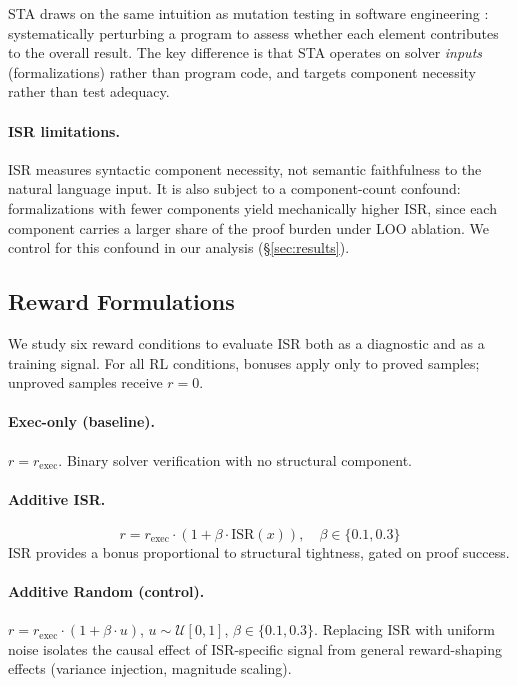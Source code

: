 STA draws on the same intuition as mutation testing in software engineering \citep{demillo1978, jia-harman-survey}: systematically perturbing a program to assess whether each element contributes to the overall result.
The key difference is that STA operates on solver \emph{inputs} (formalizations) rather than program code, and targets component necessity rather than test adequacy.

\paragraph{ISR limitations.}
ISR measures syntactic component necessity, not semantic faithfulness to the natural language input.
It is also subject to a component-count confound: formalizations with fewer components yield mechanically higher ISR, since each component carries a larger share of the proof burden under LOO ablation.
We control for this confound in our analysis (\S\ref{sec:results}).

\subsection{Reward Formulations}
\label{sec:rewards}

We study six reward conditions to evaluate ISR both as a diagnostic and as a training signal.
For all RL conditions, bonuses apply only to proved samples; unproved samples receive $r = 0$.

\paragraph{Exec-only (baseline).}
$r = r_{\text{exec}}$.
Binary solver verification with no structural component.

\paragraph{Additive ISR.}
\begin{equation}
  r = r_{\text{exec}} \cdot (1 + \beta \cdot \text{ISR}(x)), \quad \beta \in \{0.1, 0.3\}
  \label{eq:additive-isr}
\end{equation}
ISR provides a bonus proportional to structural tightness, gated on proof success.

\paragraph{Additive Random (control).}
$r = r_{\text{exec}} \cdot (1 + \beta \cdot u)$, $u \sim \mathcal{U}[0,1]$, $\beta \in \{0.1, 0.3\}$.
Replacing ISR with uniform noise isolates the causal effect of ISR-specific signal from general reward-shaping effects (variance injection, magnitude scaling).

